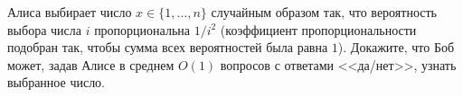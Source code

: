 Алиса выбирает число $x \in \{1, \dots, n\}$ случайным образом так, что вероятность выбора числа $i$
пропорциональна $1 / i^2$ (коэффициент пропорциональности подобран так, чтобы сумма всех вероятностей
была равна $1$). Докажите, что Боб может, задав Алисе в среднем $O(1)$ вопросов с ответами <<да/нет>>,
узнать выбранное число.